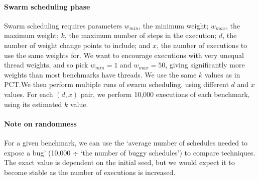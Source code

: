 \paragraph{Swarm scheduling phase}
Swarm scheduling requires parameters $w_{min}$, the minimum weight; $w_{max}$,
the maximum weight; $k$, the maximum number of steps in the execution; $d$, the
number of weight change points to include; and $x$, the number of executions to
use the same weights for.  We want to encourage executions with very unequal
thread weights, and so pick $w_{min}=1$ and $w_{max}=50$, giving significantly
more weights than most benchmarks have threads.  We use the same $k$ values as
in PCT.\@ We then perform multiple runs of swarm scheduling, using different $d$
and $x$ values.  For each $(d, x)$ pair, we perform 10,000 executions of each
benchmark, using its estimated $k$ value.

\paragraph{Note on randomness}
For a given benchmark, we can use the `average number of schedules
needed to expose a bug' (10,000 $\div$ `the number of buggy
schedules') to compare techniques.  The exact value is dependent on
the initial seed, but we would expect it to become stable as the
number of executions is increased\cite{thomson2016}.

